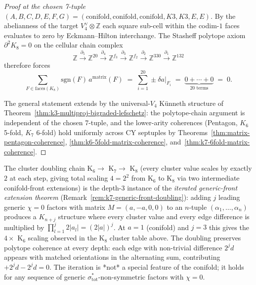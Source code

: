 \begin{proof}[Proof at the chosen 7-tuple
 $(A, B, C, D, E, F, G) = (\mathrm{conifold},
 \mathrm{conifold}, \mathrm{conifold}, K3, K3, E, E)$]
By the abelianness of the target $V_4^\vee \otimes \mathbb{Z}$ each
square sub-cell within the codim-$1$ faces evaluates to zero by
Eckmann--Hilton interchange. The Stasheff polytope axiom
$\partial^2 K_8 = 0$ on the cellular chain complex
\[
 \mathbb{Z}
 \xrightarrow{\partial_5} \mathbb{Z}^{20}
 \xrightarrow{\partial_4} \mathbb{Z}^{f_3}
 \xrightarrow{\partial_3} \mathbb{Z}^{f_2}
 \xrightarrow{\partial_2} \mathbb{Z}^{330}
 \xrightarrow{\partial_1} \mathbb{Z}^{132}
\]
therefore forces
\[
 \sum_{F \in \mathrm{faces}(K_8)} \mathrm{sgn}(F)\, a^{\mathrm{matrix}}(F)
 \;=\; \sum_{i = 1}^{20} \pm \delta a |_{F_i}
 \;=\; \underbrace{0 + \cdots + 0}_{20 \text{ terms}} \;=\; 0.
\]

The general statement extends by the universal-$V_4$ K\"unneth structure
of Theorem~\ref{thm:k3-multiproj-bigraded-lefschetz}: the polytope-chain
argument is independent of the chosen 7-tuple, and the lower-arity
coherences \textup{(}Pentagon, $K_6$ 5-fold, $K_7$ 6-fold\textup{)} hold
uniformly across CY septuples by Theorems~\ref{thm:matrix-pentagon-coherence},
\ref{thm:k6-5fold-matrix-coherence}, and~\ref{thm:k7-6fold-matrix-coherence}.
\end{proof}

\begin{remark}
\label{rem:k8-iterated-generic-front-tripling}
The cluster doubling chain K$_6 \rightarrow$ K$_7 \rightarrow$ K$_8$
\textup{(}every cluster value scales by exactly $2$ at each step,
giving total scaling $4 = 2^2$ from K$_6$ to K$_8$ via two intermediate
conifold-front extensions\textup{)} is the depth-$3$ instance of the
\emph{iterated generic-front extension theorem}
\textup{(}Remark~\ref{rem:k7-generic-front-doubling}\textup{):} adding $j$
leading generic $\chi = 0$ factors with matrix
$M = (a, -a, 0, 0)$ to an $n$-tuple $(\alpha_1, \ldots, \alpha_n)$
produces a $K_{n + j}$ structure where every cluster value and every
edge difference is multiplied by $\prod_{l = 1}^{j} 2 |a_l| = (2 |a|)^j$.
At $a = 1$ \textup{(}conifold\textup{)} and $j = 3$ this gives the $4 \times$
K$_6$ scaling observed in the K$_8$ cluster table above. The doubling
preserves polytope coherence at every depth: each edge with non-trivial
difference $2^j d$ appears with matched orientations in the alternating
sum, contributing $+ 2^j d - 2^j d = 0$. The iteration is *not* a special
feature of the conifold; it holds for any sequence of generic
$\sigma_{\mathrm{tot}}^*$-non-symmetric factors with $\chi = 0$.
\end{remark}

